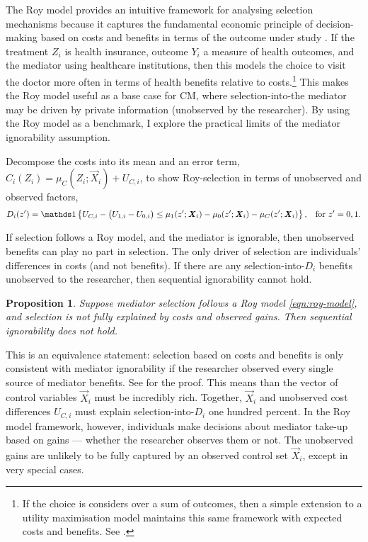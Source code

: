 The Roy model provides an intuitive framework for analysing selection mechanisms because it captures the fundamental economic principle of decision-making based on costs and benefits in terms of the outcome under study \citep{roy1951some,heckman1990empirical}.
If the treatment $Z_i$ is health insurance, outcome $Y_i$ a measure of health outcomes, and the mediator using healthcare institutions, then this models the choice to visit the doctor more often in terms of health benefits relative to costs.\footnote{
    If the choice is considers over a sum of outcomes, then a simple extension to a utility maximisation model maintains this same framework with expected costs and benefits.
    See \cite{heckman1990empirical,eisenhauer2015generalized}.
}
This makes the Roy model useful as a base case for CM, where selection-into-the mediator may be driven by private information (unobserved by the researcher).
By using the Roy model as a benchmark, I explore the practical limits of the mediator ignorability assumption.

Decompose the costs into its mean and an error term, $C_i(Z_i) = \mu_{C}(Z_i; \vec X_i) + U_{C,i}$, to show Roy-selection in terms of unobserved and observed factors,
\[ D_i(z') = \indicator{
    U_{C,i} - \big(U_{1,i} - U_{0,i}\big) \leq
        \mu_1(z'; \vec X_i) - \mu_0(z'; \vec X_i) - \mu_C(z'; \vec X_i)
    }, \;\;\; \text{for } z' = 0, 1. \]

If selection follows a Roy model, and the mediator is ignorable, then unobserved benefits can play no part in selection.
The only driver of selection are individuals' differences in costs (and not benefits).
If there are any selection-into-$D_i$ benefits unobserved to the researcher, then sequential ignorability cannot hold.
\newtheorem{proposition}{Proposition}
\begin{proposition}
    \label{prop:roy-seq-ig}
    Suppose mediator selection follows a Roy model \eqref{eqn:roy-model}, and selection is not fully explained by costs and observed gains.
    Then sequential ignorability does not hold.
\end{proposition}

This is an equivalence statement: selection based on costs and benefits is only consistent with mediator ignorability if the researcher observed every single source of mediator benefits.
See  for the proof.
This means than the vector of control variables $\vec X_i$ must be incredibly rich.
Together, $\vec X_i$ and unobserved cost differences $U_{C,i}$ must explain selection-into-$D_i$ one hundred percent.
In the Roy model framework, however, individuals make decisions about mediator take-up based on gains --- whether the researcher observes them or not.
The unobserved gains are unlikely to be fully captured by an observed control set $\vec X_i$, except in very special cases.


